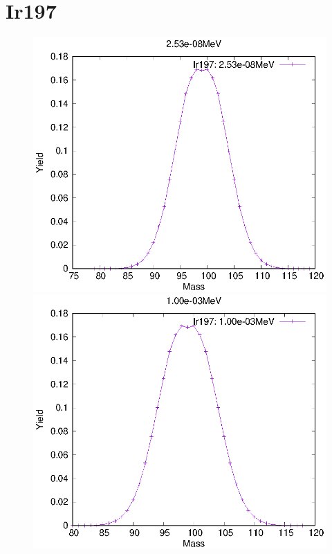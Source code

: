 \section{Ir197}
\begin{figure}[htbp]
 \begin{minipage}{0.33\textwidth} \begin{center} \includegraphics[width=\textwidth]{YA/Ir197_2.53e-08.eps} \end{center} \end{minipage}
\begin{minipage}{0.33\textwidth} \begin{center} \includegraphics[width=\textwidth]{YA/Ir197_1.00e-03.eps} \end{center} \end{minipage}

\end{figure}
